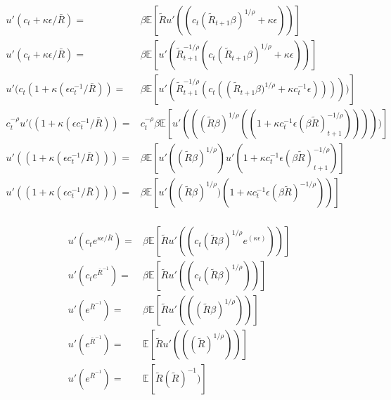 \documentclass{article}
\begin{document}
\begin{align}
  u'(c_{t}+\kappa \epsilon/\bar{R}) = & \beta \mathbb{E}[\tilde{R}u'(\left(c_{t}(\tilde{R}_{t+1} \beta)^{1/\rho}+\kappa \epsilon\right))] \\
u'(c_{t}+\kappa \epsilon/\bar{R}) = & \beta \mathbb{E}[u'(\tilde{R}^{-1/\rho}_{t+1}\left(c_{t}(\tilde{R}_{t+1} \beta)^{1/\rho}+\kappa \epsilon\right))] \\
  u'(c_{t}(1+\kappa (\epsilon c_{t}^{-1}/\bar{R})) = & \beta \mathbb{E}[u'(\tilde{R}^{-1/\rho}_{t+1}\left(c_{t}\left(\left(\tilde{R}_{t+1} \beta)^{1/\rho}+\kappa c_{t}^{-1}\epsilon\right)\right)\right)))]\\
  c_{t}^{-\rho}u'((1+\kappa (\epsilon c_{t}^{-1}/\bar{R})) = & c_{t}^{-\rho}\beta \mathbb{E}[u'(\left((\tilde{R}\beta)^{1/\rho}\left(\left(1 +\kappa c_{t}^{-1}\epsilon(\beta \tilde{R})^{-1/\rho}_{t+1}\right)\right)\right)))] \\
  u'((1+\kappa (\epsilon c_{t}^{-1}/\bar{R}))) = & \beta \mathbb{E}\left[u'((\tilde{R}\beta)^{1/\rho})u'(1 +\kappa c_{t}^{-1}\epsilon(\beta \tilde{R})^{-1/\rho}_{t+1})\right] \\
  u'((1+\kappa (\epsilon c_{t}^{-1}/\bar{R}))) = & \beta \mathbb{E}
                                                   \left[
                                                   u'\left(
                                                   (\tilde{R}\beta)^{1/\rho})
                                                   \left(
                                                   1 +\kappa c_{t}^{-1}\epsilon(\beta \tilde{R})^{-1/\rho}
                                                   \right)
                                                   \right)
                                                   \right] \\   
\end{align}

\medskip

\begin{align}
  u'(c_{t}e^{\kappa \epsilon/\bar{R}}) = & \beta \mathbb{E}[\tilde{R}u'(\left(c_{t}(\tilde{R} \beta)^{1/\rho}e^{(\kappa \epsilon)}\right))] \\
  u'(c_{t}e^{\bar{R}^{-1}}) = & \beta \mathbb{E}[\tilde{R}u'(\left(c_{t}(\tilde{R} \beta)^{1/\rho}\right))] \\
   u'(e^{\bar{R}^{-1}}) = & \beta \mathbb{E}[\tilde{R}u'(\left((\tilde{R} \beta)^{1/\rho}\right))] \\
   u'(e^{\bar{R}^{-1}}) = & \mathbb{E}[\tilde{R}u'(\left((\tilde{R})^{1/\rho}\right))] \\
   u'(e^{\bar{R}^{-1}}) = & \mathbb{E}[\tilde{R}(\tilde{R})^{-1})] \\
\end{align}
\end{document}

